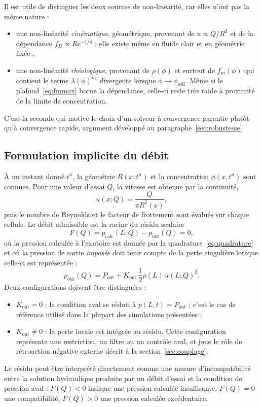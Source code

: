 \documentclass[11pt,a4paper]{report}
\newcommand{\phisol}{\phi_{\mathrm{soil}}}
\newcommand{\kout}{K_{\mathrm{out}}}
\begin{document}
Il est utile de distinguer les deux sources de non-linéarité, car elles n'ont pas la même nature :
\begin{itemize}
  \item une non-linéarité \emph{cinématique}, géométrique, provenant de \(u \propto Q/R^2\) et de la
        dépendance \(f_D \propto Re^{-1/4}\) : elle existe même en fluide clair et en géométrie fixée ;
  \item une non-linéarité \emph{rhéologique}, provenant de \(\rho(\phi)\) et surtout de \(f_m(\phi)\) qui
        contient le terme \(\lambda(\phi)^{n_\lambda}\) divergente lorsque \(\phi \to \phisol\). Même si le
        plafond~\eqref{eq:fmmax} borne la dépendance, celle-ci reste très raide à proximité de la limite de
        concentration.
\end{itemize}
C'est la seconde qui motive le choix d'un solveur à convergence garantie plutôt qu'à convergence rapide,
argument développé au paragraphe~\ref{sec:robustesse}.

\subsection{Formulation implicite du débit}
\label{sec:residu}

À un instant donné \(t^n\), la géométrie \(R(x,t^n)\) et la concentration \(\phi(x,t^n)\) sont connues. Pour
une valeur d'essai \(Q\), la vitesse est obtenue par la continuité,
\begin{equation}
u(x;Q) = \frac{Q}{\pi R^2(x)},
\label{eq:uQ}
\end{equation}
puis le nombre de Reynolds et le facteur de frottement sont évalués sur chaque cellule. Le débit admissible
est la racine du résidu scalaire
\begin{equation}
F(Q) = p_{\mathrm{calc}}(L;Q) - p_{\mathrm{out}}(Q) = 0,
\label{eq:FQ}
\end{equation}
où la pression calculée à l'exutoire est donnée par la quadrature~\eqref{eq:quadrature} et où la pression
de sortie \emph{imposée} doit tenir compte de la perte singulière lorsque celle-ci est représentée :
\begin{equation}
p_{\mathrm{out}}(Q) = P_{\mathrm{out}} + \kout\,\frac{1}{2}\rho(L)\,u(L;Q)^2 .
\label{eq:pout}
\end{equation}
Deux configurations doivent être distinguées :
\begin{itemize}
  \item \(\kout = 0\) : la condition aval se réduit à \(p(L,t) = P_{\mathrm{out}}\) ; c'est le cas de
        référence utilisé dans la plupart des simulations présentées ;
  \item \(\kout \neq 0\) : la perte locale est intégrée au résidu. Cette configuration représente une
        restriction, un filtre ou un contrôle aval, et joue le rôle de rétroaction négative externe
        décrit à la section~\ref{sec:couplage}.
\end{itemize}
Le résidu peut être interprété directement comme une mesure d'incompatibilité entre la solution hydraulique
produite par un débit d'essai et la condition de pression aval : \(F(Q)<0\) indique une pression calculée
insuffisante, \(F(Q)=0\) une compatibilité, \(F(Q)>0\) une pression calculée excédentaire.
\end{document}
